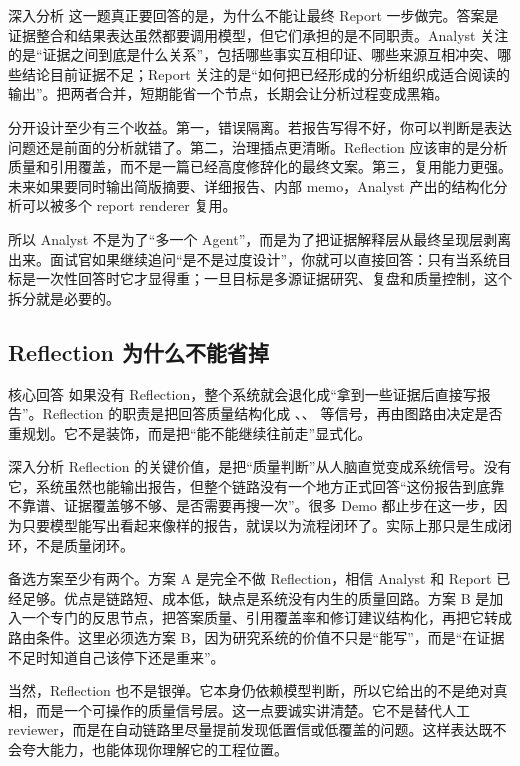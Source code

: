 \documentclass[12pt]{article}
\begin{document}
\begin{analysisBox}{深入分析}
这一题真正要回答的是，为什么不能让最终 Report 一步做完。答案是证据整合和结果表达虽然都要调用模型，但它们承担的是不同职责。Analyst 关注的是“证据之间到底是什么关系”，包括哪些事实互相印证、哪些来源互相冲突、哪些结论目前证据不足；Report 关注的是“如何把已经形成的分析组织成适合阅读的输出”。把两者合并，短期能省一个节点，长期会让分析过程变成黑箱。

分开设计至少有三个收益。第一，错误隔离。若报告写得不好，你可以判断是表达问题还是前面的分析就错了。第二，治理插点更清晰。Reflection 应该审的是分析质量和引用覆盖，而不是一篇已经高度修辞化的最终文案。第三，复用能力更强。未来如果要同时输出简版摘要、详细报告、内部 memo，Analyst 产出的结构化分析可以被多个 report renderer 复用。

所以 Analyst 不是为了“多一个 Agent”，而是为了把证据解释层从最终呈现层剥离出来。面试官如果继续追问“是不是过度设计”，你就可以直接回答：只有当系统目标是一次性回答时它才显得重；一旦目标是多源证据研究、复盘和质量控制，这个拆分就是必要的。
\end{analysisBox}

\subsection{Reflection 为什么不能省掉}
\begin{qaBox}{核心回答}
如果没有 Reflection，整个系统就会退化成“拿到一些证据后直接写报告”。Reflection 的职责是把回答质量结构化成 、、 等信号，再由图路由决定是否重规划。它不是装饰，而是把“能不能继续往前走”显式化。
\end{qaBox}

\begin{analysisBox}{深入分析}
Reflection 的关键价值，是把“质量判断”从人脑直觉变成系统信号。没有它，系统虽然也能输出报告，但整个链路没有一个地方正式回答“这份报告到底靠不靠谱、证据覆盖够不够、是否需要再搜一次”。很多 Demo 都止步在这一步，因为只要模型能写出看起来像样的报告，就误以为流程闭环了。实际上那只是生成闭环，不是质量闭环。

备选方案至少有两个。方案 A 是完全不做 Reflection，相信 Analyst 和 Report 已经足够。优点是链路短、成本低，缺点是系统没有内生的质量回路。方案 B 是加入一个专门的反思节点，把答案质量、引用覆盖率和修订建议结构化，再把它转成路由条件。这里必须选方案 B，因为研究系统的价值不只是“能写”，而是“在证据不足时知道自己该停下还是重来”。

当然，Reflection 也不是银弹。它本身仍依赖模型判断，所以它给出的不是绝对真相，而是一个可操作的质量信号层。这一点要诚实讲清楚。它不是替代人工 reviewer，而是在自动链路里尽量提前发现低置信或低覆盖的问题。这样表达既不会夸大能力，也能体现你理解它的工程位置。
\end{analysisBox}
\end{document}
